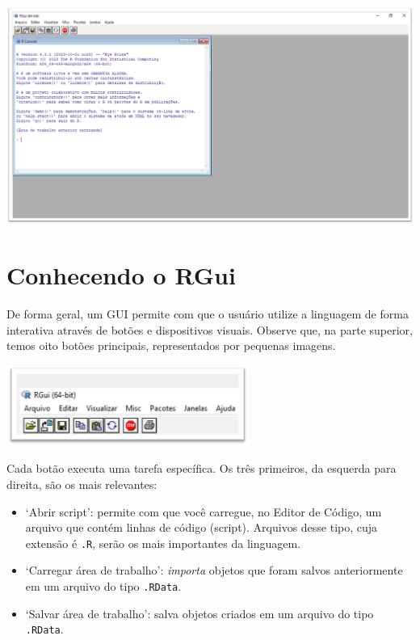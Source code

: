 \documentclass[
  letterpaper,
  DIV=11,
  numbers=noendperiod]{scrreprt}
\begin{document}
\begin{center}
\includegraphics{images/clipboard-2094164095.png}
\end{center}

\section{Conhecendo o RGui}\label{conhecendo-o-rgui}

De forma geral, um GUI permite com que o usuário utilize a linguagem de
forma interativa através de botões e dispositivos visuais. Observe que,
na parte superior, temos oito botões principais, representados por
pequenas imagens.

\begin{center}
\includegraphics[width=3.125in,height=\textheight]{images/clipboard-3228534230.png}
\end{center}

Cada botão executa uma tarefa específica. Os três primeiros, da esquerda
para direita, são os mais relevantes:

\begin{itemize}
\item
  `Abrir script': permite com que você carregue, no Editor de Código, um
  arquivo que contém linhas de código (script). Arquivos desse tipo,
  cuja extensão é \texttt{.R}, serão os mais importantes da linguagem.
\item
  `Carregar área de trabalho': \emph{importa} objetos que foram salvos
  anteriormente em um arquivo do tipo \texttt{.RData}.
\item
  `Salvar área de trabalho': salva objetos criados em um arquivo do tipo
  \texttt{.RData}.
\end{itemize}
\end{document}
